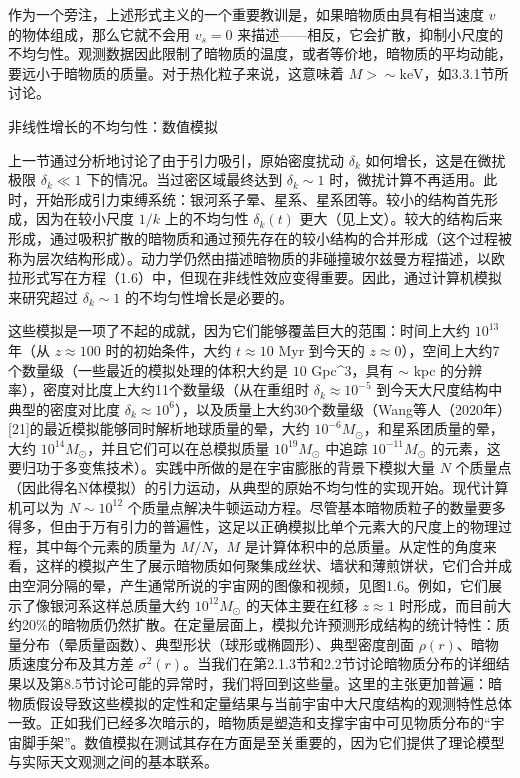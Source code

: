 

作为一个旁注，上述形式主义的一个重要教训是，如果暗物质由具有相当速度 \( v \) 的物体组成，那么它就不会用 \( v_s = 0 \) 来描述——相反，它会扩散，抑制小尺度的不均匀性。观测数据因此限制了暗物质的温度，或者等价地，暗物质的平均动能，要远小于暗物质的质量。对于热化粒子来说，这意味着 \( M > \sim \text{keV} \)，如3.3.1节所讨论。

非线性增长的不均匀性：数值模拟

上一节通过分析地讨论了由于引力吸引，原始密度扰动 \( \delta_k \) 如何增长，这是在微扰极限 \( \delta_k \ll 1 \) 下的情况。当过密区域最终达到 \( \delta_k \sim 1 \) 时，微扰计算不再适用。此时，开始形成引力束缚系统：银河系子晕、星系、星系团等。较小的结构首先形成，因为在较小尺度 \( 1/k \) 上的不均匀性 \( \delta_k(t) \) 更大（见上文）。较大的结构后来形成，通过吸积扩散的暗物质和通过预先存在的较小结构的合并形成（这个过程被称为层次结构形成）。动力学仍然由描述暗物质的非碰撞玻尔兹曼方程描述，以欧拉形式写在方程（1.6）中，但现在非线性效应变得重要。因此，通过计算机模拟来研究超过 \( \delta_k \sim 1 \) 的不均匀性增长是必要的。

这些模拟是一项了不起的成就，因为它们能够覆盖巨大的范围：时间上大约 \( 10^{13} \) 年（从 \( z \approx 100 \) 时的初始条件，大约 \( t \approx 10 \) Myr 到今天的 \( z \approx 0 \)），空间上大约7个数量级（一些最近的模拟处理的体积大约是 \( 10 \) Gpc^3，具有 \( \sim \) kpc 的分辨率），密度对比度上大约11个数量级（从在重组时 \( \delta_k \approx 10^{-5} \) 到今天大尺度结构中典型的密度对比度 \( \delta_k \approx 10^6 \)），以及质量上大约30个数量级（Wang等人（2020年）[21]的最近模拟能够同时解析地球质量的晕，大约 \( 10^{-6} M_{\odot} \)，和星系团质量的晕，大约 \( 10^{14} M_{\odot} \)，并且它们可以在总模拟质量 \( 10^{19} M_{\odot} \) 中追踪 \( 10^{-11} M_{\odot} \) 的元素，这要归功于多变焦技术）。实践中所做的是在宇宙膨胀的背景下模拟大量 \( N \) 个质量点（因此得名N体模拟）的引力运动，从典型的原始不均匀性的实现开始。现代计算机可以为 \( N \sim 10^{12} \) 个质量点解决牛顿运动方程。尽管基本暗物质粒子的数量要多得多，但由于万有引力的普遍性，这足以正确模拟比单个元素大的尺度上的物理过程，其中每个元素的质量为 \( M/N \)，\( M \) 是计算体积中的总质量。从定性的角度来看，这样的模拟产生了展示暗物质如何聚集成丝状、墙状和薄煎饼状，它们合并成由空洞分隔的晕，产生通常所说的宇宙网的图像和视频，见图1.6。例如，它们展示了像银河系这样总质量大约 \( 10^{12} M_{\odot} \) 的天体主要在红移 \( z \approx 1 \) 时形成，而目前大约20\%的暗物质仍然扩散。在定量层面上，模拟允许预测形成结构的统计特性：质量分布（晕质量函数）、典型形状（球形或椭圆形）、典型密度剖面 \( \rho(r) \)、暗物质速度分布及其方差 \( \sigma^2(r) \)。当我们在第2.1.3节和2.2节讨论暗物质分布的详细结果以及第8.5节讨论可能的异常时，我们将回到这些量。这里的主张更加普遍：暗物质假设导致这些模拟的定性和定量结果与当前宇宙中大尺度结构的观测特性总体一致。正如我们已经多次暗示的，暗物质是塑造和支撑宇宙中可见物质分布的“宇宙脚手架”。数值模拟在测试其存在方面是至关重要的，因为它们提供了理论模型与实际天文观测之间的基本联系。

